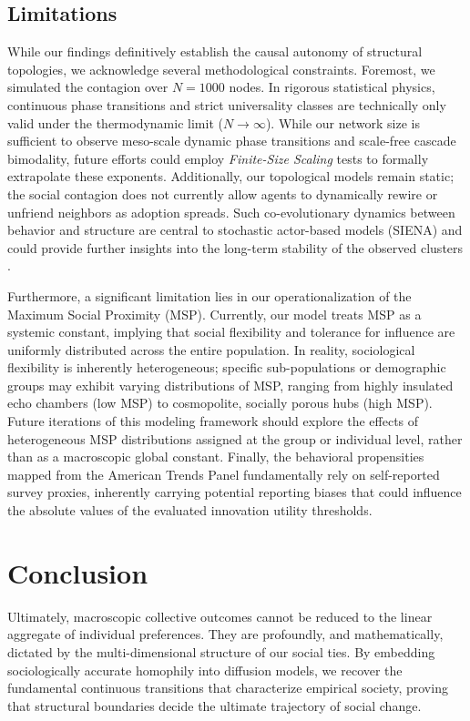 \documentclass[5p,twocolumn,authoryear]{elsarticle}
\begin{document}
\subsection{Limitations}
While our findings definitively establish the causal autonomy of structural topologies, we acknowledge several methodological constraints. Foremost, we simulated the contagion over $N=1000$ nodes. In rigorous statistical physics, continuous phase transitions and strict universality classes are technically only valid under the thermodynamic limit ($N \to \infty$). While our network size is sufficient to observe meso-scale dynamic phase transitions and scale-free cascade bimodality, future efforts could employ \textit{Finite-Size Scaling} tests to formally extrapolate these exponents. Additionally, our topological models remain static; the social contagion does not currently allow agents to dynamically rewire or unfriend neighbors as adoption spreads. Such co-evolutionary dynamics between behavior and structure are central to stochastic actor-based models (SIENA) and could provide further insights into the long-term stability of the observed clusters \citep{snijders2010}.

Furthermore, a significant limitation lies in our operationalization of the Maximum Social Proximity (MSP). Currently, our model treats MSP as a systemic constant, implying that social flexibility and tolerance for influence are uniformly distributed across the entire population. In reality, sociological flexibility is inherently heterogeneous; specific sub-populations or demographic groups may exhibit varying distributions of MSP, ranging from highly insulated echo chambers (low MSP) to cosmopolite, socially porous hubs (high MSP). Future iterations of this modeling framework should explore the effects of heterogeneous MSP distributions assigned at the group or individual level, rather than as a macroscopic global constant. Finally, the behavioral propensities mapped from the American Trends Panel fundamentally rely on self-reported survey proxies, inherently carrying potential reporting biases that could influence the absolute values of the evaluated innovation utility thresholds.

\section{Conclusion}

Ultimately, macroscopic collective outcomes cannot be reduced to the linear aggregate of individual preferences. They are profoundly, and mathematically, dictated by the multi-dimensional structure of our social ties. By embedding sociologically accurate homophily into diffusion models, we recover the fundamental continuous transitions that characterize empirical society, proving that structural boundaries decide the ultimate trajectory of social change.



\end{document}
